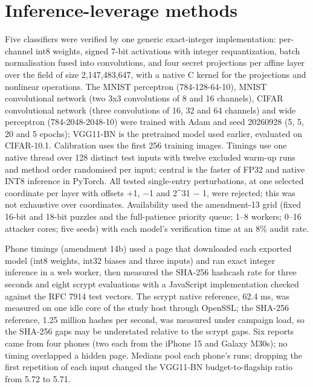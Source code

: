 \documentclass[11pt]{article}
\begin{document}
\section{Inference-leverage methods}

Five classifiers were verified by one generic exact-integer implementation: per-channel int8 weights, signed 7-bit activations with integer requantization, batch normalisation fused into convolutions, and four secret projections per affine layer over the field of size 2,147,483,647, with a native C kernel for the projections and nonlinear operations. The MNIST perceptron (784-128-64-10), MNIST convolutional network (two 3x3 convolutions of 8 and 16 channels), CIFAR convolutional network (three convolutions of 16, 32 and 64 channels) and wide perceptron (784-2048-2048-10) were trained with Adam and seed 20260928 (5, 5, 20 and 5 epochs); VGG11-BN is the pretrained model used earlier, evaluated on CIFAR-10.1. Calibration uses the first 256 training images. Timings use one native thread over 128 distinct test inputs with twelve excluded warm-up runs and method order randomised per input; central is the faster of FP32 and native INT8 inference in PyTorch. All tested single-entry perturbations, at one selected coordinate per layer with offsets +1, $-$1 and 2\textasciicircum{}31 $-$ 1, were rejected; this was not exhaustive over coordinates. Availability used the amendment-13 grid (fixed 16-bit and 18-bit puzzles and the full-patience priority queue; 1--8 workers; 0--16 attacker cores; five seeds) with each model's verification time at an 8\% audit rate.

Phone timings (amendment 14b) used a page that downloaded each exported model (int8 weights, int32 biases and three inputs) and ran exact integer inference in a web worker, then measured the SHA-256 hashcash rate for three seconds and eight scrypt evaluations with a JavaScript implementation checked against the RFC 7914 test vectors. The scrypt native reference, 62.4 ms, was measured on one idle core of the study host through OpenSSL; the SHA-256 reference, 1.25 million hashes per second, was measured under campaign load, so the SHA-256 gaps may be understated relative to the scrypt gaps. Six reports came from four phones (two each from the iPhone 15 and Galaxy M30s); no timing overlapped a hidden page. Medians pool each phone's runs; dropping the first repetition of each input changed the VGG11-BN budget-to-flagship ratio from 5.72 to 5.71.
\end{document}
